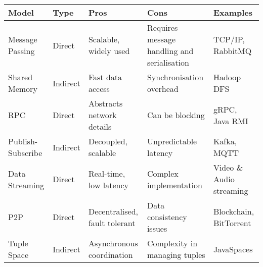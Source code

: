\begin{center}
  \begin{tabular}{ p{} p{} p{} p{} p{} }
    Model & Type & Pros & Cons & Examples\\
    \hline
    Message Passing & Direct & Scalable, widely used & Requires message handling and serialisation & TCP/IP, RabbitMQ\\
    Shared Memory & Indirect & Fast data access & Synchronisation overhead & Hadoop DFS\\
    RPC & Direct & Abstracts network details & Can be blocking & gRPC, Java RMI\\
    Publish-Subscribe & Indirect & Decoupled, scalable & Unpredictable latency & Kafka, MQTT\\
    Data Streaming & Direct & Real-time, low latency & Complex implementation & Video \& Audio streaming\\
    P2P & Direct & Decentralised, fault tolerant & Data consistency issues & Blockchain, BitTorrent\\
    Tuple Space & Indirect & Asynchronous coordination & Complexity in managing tuples & JavaSpaces\\
  \end{tabular}
\end{center}
